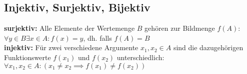 \documentclass[8pt,landscape]{scrartcl}
\begin{document}
\begin{multicols}{3}
\subsection{Injektiv, Surjektiv, Bijektiv}
\textbf{surjektiv:} Alle Elemente der Wertemenge $B$ gehören zur Bildmenge $f(A)$:\\
$\forall y \in B \exists x \in A : f(x) = y$, dh. falls $f(A) = B$\\
\textbf{injektiv:} F\"ur zwei verschiedene Argumente $x_1, x_2 \in A$ sind die dazugeh\"origen Funktionswerte $f(x_1)$ und $f(x_2)$ unterschiedlich:\\
$\forall x_1, x_2 \in A : (x_1 \not = x_2 \implies f(x_1) \not = f(x_2))$







\end{multicols}
\end{document}
